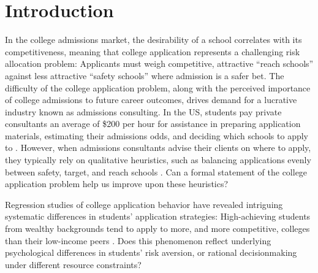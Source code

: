 \section{Introduction}

In the college admissions market, the desirability of a school correlates with its competitiveness, meaning that college application represents a challenging risk allocation problem: Applicants must weigh competitive, attractive ``reach schools'' against less attractive ``safety schools'' where admission is a safer bet. The difficulty of the college application problem, along with the perceived importance of college admissions to future career outcomes, drives demand for a lucrative industry known as admissions consulting. In the US, students pay private consultants an average of \$200 per hour for assistance in preparing application materials, estimating their admissions odds, and deciding which schools to apply to \citep{sklarow2018}. However, when admissions consultants advise their clients on where to apply, they typically rely on qualitative heuristics, such as balancing applications evenly between safety, target, and reach schools \citep{jeon2015,peck2021}. Can a formal statement of the college application problem help us improve upon these heuristics? 

Regression studies of college application behavior have revealed intriguing systematic differences in students' application strategies: High-achieving students from wealthy backgrounds tend to apply to more, and more competitive, colleges than their low-income peers \citep{hartlaubandschneider2012,vanhuizenandalessie2019}. Does this phenomenon reflect underlying psychological differences in students' risk aversion, or rational decisionmaking under different resource constraints? %

